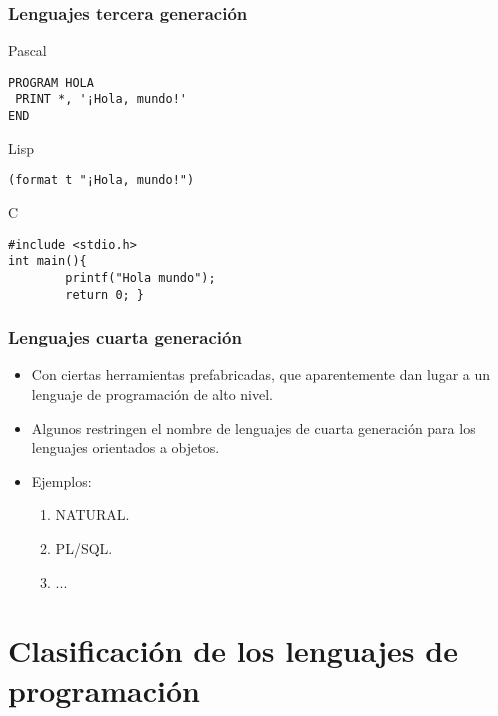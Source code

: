 \documentclass{beamer}
\begin{document}
\begin{frame}[fragile]
\frametitle{Lenguajes tercera generación} 
\begin{block}{Pascal}
\begin{verbatim}
PROGRAM HOLA
 PRINT *, '¡Hola, mundo!'
END
\end{verbatim}
\end{block}
\pause
\begin{exampleblock}{Lisp}
\begin{verbatim}
(format t "¡Hola, mundo!")
\end{verbatim}
\end{exampleblock}
\pause
\begin{alertblock}{C}
\begin{verbatim}
#include <stdio.h>
int main(){
        printf("Hola mundo");
        return 0; }
\end{verbatim}
\end{alertblock}
\end{frame}

\begin{frame}
\frametitle{Lenguajes cuarta generación}
\begin{itemize}[<+->]
\item Con ciertas herramientas prefabricadas, que aparentemente dan lugar a un lenguaje de programación de alto nivel.
\item Algunos restringen el nombre de lenguajes de cuarta generación para los lenguajes orientados a objetos.
\item Ejemplos:
\begin{enumerate}
\item NATURAL.
\item PL/SQL.
\item ...
\end{enumerate}
\end{itemize}
\end{frame}

\section{Clasificación de los lenguajes de programación}
\end{document}
